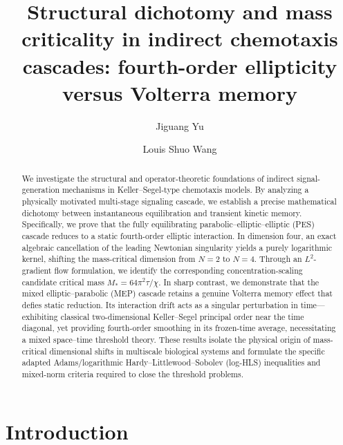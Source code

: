 \documentclass[11pt,reqno]{amsart}
\title[Critical Mass in Chemotaxis: Elliptic vs Volterra]
{Structural dichotomy and mass criticality in indirect chemotaxis cascades: fourth-order ellipticity versus Volterra memory}
\author{Jiguang Yu}
\author{Louis Shuo Wang}
\date{}
\theoremstyle{definition}
\theoremstyle{remark}
\begin{document}


\begin{abstract}
We investigate the structural and operator-theoretic foundations of indirect signal-generation mechanisms in Keller–Segel-type chemotaxis models. By analyzing a physically motivated multi-stage signaling cascade, we establish a precise mathematical dichotomy between instantaneous equilibration and transient kinetic memory. Specifically, we prove that the fully equilibrating parabolic–elliptic–elliptic (PES) cascade reduces to a static fourth-order elliptic interaction. In dimension four, an exact algebraic cancellation of the leading Newtonian singularity yields a purely logarithmic kernel, shifting the mass-critical dimension from $N=2$ to $N=4$. Through an $L^2$-gradient flow formulation, we identify the corresponding concentration-scaling candidate critical mass $M_* = 64\pi^2\tau/\chi$. In sharp contrast, we demonstrate that the mixed elliptic–parabolic (MEP) cascade retains a genuine Volterra memory effect that defies static reduction. Its interaction drift acts as a singular perturbation in time—exhibiting classical two-dimensional Keller–Segel principal order near the time diagonal, yet providing fourth-order smoothing in its frozen-time average, necessitating a mixed space–time threshold theory. These results isolate the physical origin of mass-critical dimensional shifts in multiscale biological systems and formulate the specific adapted Adams/logarithmic Hardy–Littlewood–Sobolev (log-HLS) inequalities and mixed-norm criteria required to close the threshold problems.
\end{abstract}

\maketitle

\section{Introduction}
\label{sec:intro}
\end{document}
